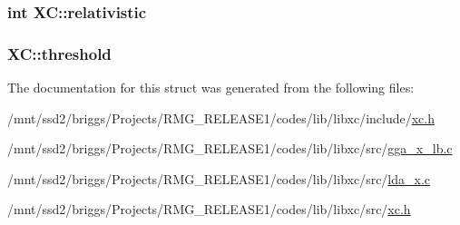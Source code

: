 \hypertarget{struct_x_c_adac41ef18b800cf0c958139d831a32af}{
\subsubsection[{relativistic}]{\setlength{\rightskip}{0pt plus 5cm}int X\-C\-::relativistic}}\label{struct_x_c_adac41ef18b800cf0c958139d831a32af}
\hypertarget{struct_x_c_a0701fad6b63618f9f405ad085b899617}{
\subsubsection[{threshold}]{ X\-C\-::threshold}}\label{struct_x_c_a0701fad6b63618f9f405ad085b899617}


The documentation for this struct was generated from the following files\-:\begin{DoxyCompactItemize}
\item 
/mnt/ssd2/briggs/\-Projects/\-R\-M\-G\-\_\-\-R\-E\-L\-E\-A\-S\-E1/codes/lib/libxc/include/\hyperlink{lib_2libxc_2include_2xc_8h}{xc.\-h}\item 
/mnt/ssd2/briggs/\-Projects/\-R\-M\-G\-\_\-\-R\-E\-L\-E\-A\-S\-E1/codes/lib/libxc/src/\hyperlink{gga__x__lb_8c}{gga\-\_\-x\-\_\-lb.\-c}\item 
/mnt/ssd2/briggs/\-Projects/\-R\-M\-G\-\_\-\-R\-E\-L\-E\-A\-S\-E1/codes/lib/libxc/src/\hyperlink{lda__x_8c}{lda\-\_\-x.\-c}\item 
/mnt/ssd2/briggs/\-Projects/\-R\-M\-G\-\_\-\-R\-E\-L\-E\-A\-S\-E1/codes/lib/libxc/src/\hyperlink{lib_2libxc_2src_2xc_8h}{xc.\-h}\end{DoxyCompactItemize}
